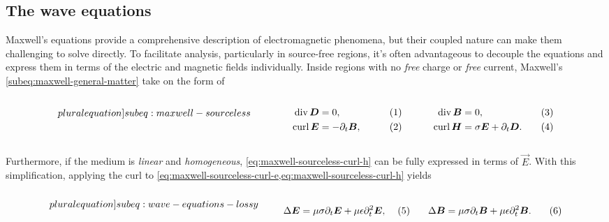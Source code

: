 \documentclass[11pt,a4paper,twoside,openany]{report}
\begin{document}
\subsection{The wave equations}
Maxwell's equations provide a comprehensive description of electromagnetic phenomena, but their coupled nature can make them challenging to solve directly. To facilitate analysis, particularly in source-free regions, it's often advantageous to decouple the equations and express them in terms of the electric and magnetic fields individually. Inside regions with no \emph{free} charge or \emph{free} current, Maxwell's \cref{subeq:maxwell-general-matter} take on the form of\\
\begin{subequations}
    \label[pluralequation]{subeq:maxwell-sourceless}
    \noindent\centering
    \begin{minipage}{0.45\textwidth}
        \begin{align}
            \label{eq:maxwell-sourceless-div-d}
            \Div \vec D &= 0,
        \\
            \label{eq:maxwell-sourceless-curl-e}
            \Curl \vec E &= -\partial_t\vec B,
        \end{align}
    \end{minipage}
    \hfill
    \begin{minipage}{0.45\textwidth}
        \begin{align}
            \label{eq:maxwell-sourceless-div-b}
            \Div\vec B &= 0,
        \\
            \label{eq:maxwell-sourceless-curl-h}
            \Curl\vec H &= \sigma\vec E + \partial_t\vec D.
        \end{align}
    \end{minipage}\bigskip
\end{subequations}\\
Furthermore, if the medium is \emph{linear} and \emph{homogeneous}, \cref{eq:maxwell-sourceless-curl-h} can be fully expressed in terms of $\vec E$. With this simplification, applying the curl to \cref{eq:maxwell-sourceless-curl-e,eq:maxwell-sourceless-curl-h} yields

\begin{subequations}
    \label[pluralequation]{subeq:wave-equations-lossy}
    \noindent\centering
    \begin{minipage}{0.45\textwidth}
        \begin{align}
            \label{eq:wave-equation-e}
            \Delta\vec E &= \mu\sigma\partial_t\vec E + \mu\epsilon\partial^2_t\vec E,
        \end{align}
    \end{minipage}
    \hfill
    \begin{minipage}{0.45\textwidth}
        \begin{align}
            \label{eq:wave-equation-b}
            \Delta\vec B &= \mu\sigma\partial_t\vec B + \mu\epsilon\partial^2_t\vec B.
        \end{align}
    \end{minipage}\bigskip
\end{subequations}
\end{document}
